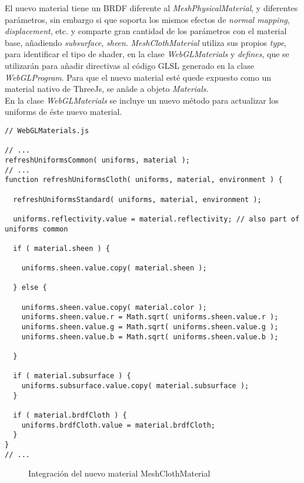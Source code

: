 El nuevo material tiene un BRDF diferente al \textit{MeshPhysicalMaterial},
y diferentes par\'ametros, sin embargo si que soporta los mismos efectos de \textit{normal mapping}, \textit{displacement}, etc.
y comparte gran cantidad de los par\'ametros con el material base, a\~nadiendo \textit{subsurface}, \textit{sheen}.
\textit{MeshClothMaterial} utiliza sus propios \textit{type}, para identificar el tipo
de shader, en la clase \textit{WebGLMaterials} y \textit{defines}, que se utilizar\'an para a\~nadir directivas al c\'odigo GLSL
generado en la clase \textit{WebGLProgram}. Para que el nuevo material est\'e quede expuesto como un material nativo de ThreeJs,
se an\~ade a objeto \textit{Materials}.\\

En la clase \textit{WebGLMaterials} se incluye un nuevo m\'etodo para actualizar los uniforms de \'este nuevo material.\\

\singlespacing
\begin{lstlisting}[caption=Cambios sobre la clase WebGLMaterials de ThreeJs]
// WebGLMaterials.js

// ...
refreshUniformsCommon( uniforms, material );
// ...
function refreshUniformsCloth( uniforms, material, environment ) {

  refreshUniformsStandard( uniforms, material, environment );

  uniforms.reflectivity.value = material.reflectivity; // also part of uniforms common

  if ( material.sheen ) {

    uniforms.sheen.value.copy( material.sheen );

  } else {

    uniforms.sheen.value.copy( material.color );
    uniforms.sheen.value.r = Math.sqrt( uniforms.sheen.value.r );
    uniforms.sheen.value.g = Math.sqrt( uniforms.sheen.value.g );
    uniforms.sheen.value.b = Math.sqrt( uniforms.sheen.value.b );

  }

  if ( material.subsurface ) {
    uniforms.subsurface.value.copy( material.subsurface );
  }

  if ( material.brdfCloth ) {
    uniforms.brdfCloth.value = material.brdfCloth;
  }
}
// ...
\end{lstlisting}
\singlespacing

\begin{figure}[H]
  \vspace{0.5cm}
  \centering
  \caption{Integraci\'on del nuevo material MeshClothMaterial}
\end{figure}
\singlespacing


